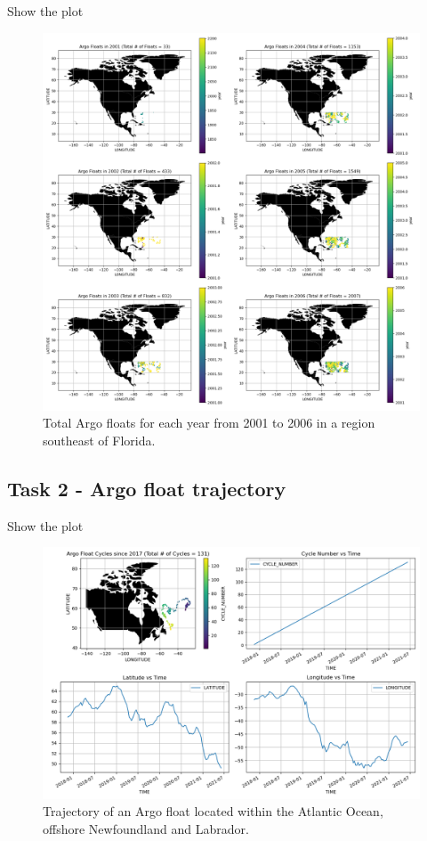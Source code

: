 \documentclass{article}
\begin{document}
Show the plot

\begin{figure}
\includegraphics[width=\textwidth,height=\textheight,keepaspectratio]{total_argo.png}
\caption{Total Argo floats for each year from 2001 to 2006 in a region southeast of Florida.}
 
\end{figure}


\subsection{Task 2 - Argo float trajectory}

Show the plot

\begin{figure}[!ht]
\includegraphics[width=\textwidth,height=\textheight,keepaspectratio]{argo_trajectory.png}
\caption{Trajectory of an Argo float located within the Atlantic Ocean, offshore Newfoundland and Labrador.}
\end{figure}
 
\end{document}
